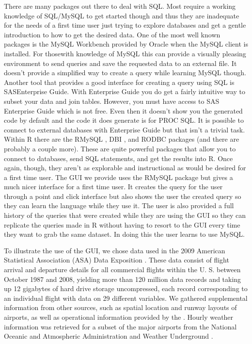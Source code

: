 \documentclass[11pt]{tise_style}
\begin{document}
There are many packages out there to deal with SQL.  Most require a working knowledge of SQL/MySQL to get started though and thus they are inadequate for the needs of a first time user just trying to explore databases and get a gentle introduction to how to get the desired data.  One of the most well known packages is the MySQL Workbench provided by Oracle when the MySQL client is installed.  For thosewith knowledge of MySQL this can provide a visually pleasing environment to send queries and save the requested data to an external file.  It doesn't provide a simplified way to create a query while learning MySQL though.  Another tool that provides a good interface for creating a query using SQL is SAS\textregistered Enterprise Guide\textregistered.  With Enterprise Guide you do get a fairly intuitive way to subset your data and join tables.  However, you must have access to SAS Enterprise Guide which is not free.  Even then it doesn't show you the generated code by default and the code it does generate is for PROC SQL.  It is possible to connect to external databases with Enterprise Guide but that isn't a trivial task.  Within R there are the RMySQL \citep{rmysql}, DBI \citep{dbi}, and RODBC \citep{rodbc} packages (and there are probably a couple more).  These are quite powerful packages that allow you to connect to databases, send SQL statements, and get the results into R.  Once again, though, they aren't as explorable and instructional as would be desired for a first time user.  The GUI we provide uses the RMySQL package but gives a much nicer interface for a first time user.  It creates the query for the user through a point and click interface but also shows the user the created query so they can learn the language while they use it.  The user is also provided a full history of the queries that were created while they are using the GUI so they can replicate the queries made in R without having to resort to the GUI every time they want to grab the same dataset.  In doing this the user learns to use MySQL.

To illustrate the use of the GUI, we chose data used in the 2009 American Statistical
Association (ASA) Data Exposition \citep{dataexpo, dataexpourl}. These data consist of flight arrival and departure details for all commercial flights within the U.\! S.\! between October 1987 and 2008, yielding more than 120 million data records and taking up 12 gigabytes of hard drive storage uncompressed, each record corresponding to an individual flight with data on 29 different variables. 
We gathered supplemental information from other sources, such as spatial location and runway layouts of airports, as well as operational information provided by the \citet{faa}. Hourly weather information was retrieved for a subset of the major airports from the National Oceanic and Atmospheric Administration \citep{noaa} and Weather Underground \citep{wunderground}. 
\end{document}
